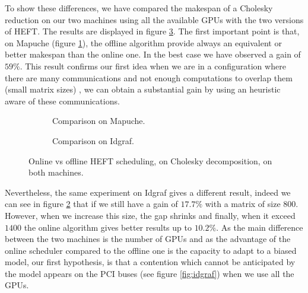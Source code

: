 \documentclass[10pt, conference, compsocconf,pdftex,dvipsnames]{IEEEtran}
\begin{document}
To show these differences, we have compared the makespan of a Cholesky
reduction on our two machines using all the available GPUs  with the two
versions of HEFT. The results are displayed in figure \ref{fig:OnOff}. The
first important point is that, on Mapuche (figure \ref{fig:OnOffMapuche}), the
offline algorithm provide always an equivalent or better makespan than the
online one. In the best case we have observed a gain of $59\%$. This result
confirms our first idea when we are in a configuration where there are many
communications and not enough computations to overlap them (small matrix
sizes) , we can obtain a substantial gain by using an heuristic aware of these
communications. 

\begin{figure}[htb]
    \centering
    \begin{subfigure}{0.4\textwidth}
        \hspace{-20pt}
        \scalebox{0.6}{
            
        }
        \caption{Comparison on Mapuche.}
        \label{fig:OnOffMapuche}
   \end{subfigure}
   \hspace{15pt}
    \begin{subfigure}{0.55\textwidth}
        \scalebox{0.6}{
            
        }
        \caption{Comparison on Idgraf.}
        \label{fig:OnOffIdgraf}
    \end{subfigure}
    \caption{Online vs offline HEFT scheduling, on Cholesky decomposition, on both
    machines.}
    \label{fig:OnOff}
\end{figure}

Nevertheless, the same experiment on Idgraf gives a different result, indeed
we can see in figure \ref{fig:OnOffIdgraf} that if we still have a gain of
$17.7\%$ with a matrix of size $800$. However, when we increase this size, the
gap shrinks and finally, when it exceed $1400$ the online algorithm gives
better results up to $10.2\%$. As the main difference between the two machines
is the number of GPUs and as the advantage of the online scheduler compared to
the offline one is the capacity to adapt to a biased model, our first
hypothesis, is that a contention which cannot be anticipated by the model
appears on the PCI buses (see figure \ref{fig:idgraf}) when we use all the
GPUs. 
\end{document}
